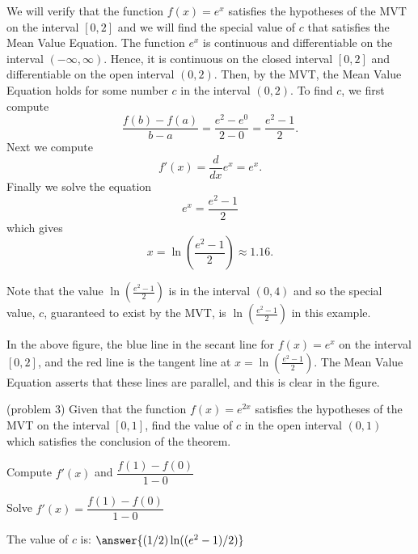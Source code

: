 \documentclass[handout]{ximera}
\begin{document}
\begin{example}[example 3]
We will verify that the function $f(x) = e^x$ satisfies the hypotheses of the MVT
on the interval $[0,2]$ and we will find the special value of $c$ that satisfies the Mean Value Equation.
The function $e^x$ is continuous and differentiable on the interval $(-\infty, \infty)$. 
Hence, it is continuous on the closed interval $[0, 2]$ and differentiable on the open interval $(0, 2)$. 
Then, by the MVT,  the Mean Value Equation holds for some number 
$c$ in the interval $(0, 2)$. To find $c$, we first compute
\[\frac{f(b) - f(a)}{b-a} = \frac{e^2 - e^0}{2-0} = \frac{e^2 - 1}{2}.\]
Next we compute
\[f'(x) = \frac{d}{dx} e^x = e^x.\]
Finally we solve the equation
\[e^x = \frac{e^2 - 1}{2}\]
which gives
\[ x = \ln(\frac{e^2 - 1}{2}) \approx 1.16.\]

Note that the value $\ln(\frac{e^2 - 1}{2})$ is in the interval $(0,4)$ and so the special value, $c$, 
guaranteed to exist by the MVT,
is $\ln(\frac{e^2 - 1}{2})$ in this example.


\begin{image}
\end{image}

In the above figure, the blue line in the secant line for $f(x) = e^x$ on the interval $[0, 2]$, 
and the red line is the tangent line at $x = \ln(\frac{e^2 - 1}{2})$. 
The Mean Value Equation asserts that these lines are parallel, and this
is clear in the figure.
\end{example}


\begin{problem}(problem 3)
  Given that the function $f(x) = e^{2x}$ satisfies the hypotheses of the MVT on the
	interval $[0,1]$, find the value of $c$ in the open interval $(0,1)$ which satisfies 
	the conclusion of the theorem.
	
    \begin{hint}
      Compute $f'(x)$ and $\dfrac{f(1) - f(0)}{1-0}$
    \end{hint}
		\begin{hint}
		  Solve $f'(x) = \dfrac{f(1) - f(0)}{1-0}$
		\end{hint}
		
		The value of $c$ is:
		 $\answer{(1/2) \ln((e^2 -1)/2)}$
\end{problem}
\end{document}
